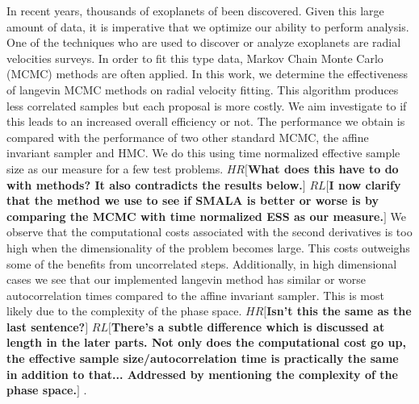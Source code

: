 \documentclass{aa}
\def\memohr#1{\color{blue}$HR[${\bf #1}$]$ \color{black}}
\def\memorl#1{\color{gray}$RL[${\bf #1}$]$ \color{black}}
\begin{document}
  \abstract
   {In recent years, thousands of exoplanets of been discovered. 
Given this large amount of data, it is imperative that we optimize our ability to perform analysis. 
One of the techniques who are used to discover or analyze exoplanets are radial velocities surveys. 
In order to fit this type data, Markov Chain Monte Carlo (MCMC) methods are often applied.}
   {In this work, we determine the effectiveness of langevin MCMC methods on radial velocity fitting. 
This algorithm produces less correlated samples but each proposal is more costly. 
We aim investigate to if this leads to an increased overall efficiency or not.}
   {The performance we obtain is compared with the performance of two other standard MCMC, the affine invariant sampler and HMC.
We do this using time normalized effective sample size as our measure for a few test problems. 
\memohr{What does this have to do with methods? It also contradicts the results below.}
\memorl{I now clarify that the method we use to see if SMALA is better or worse is by comparing the MCMC with time normalized ESS as our measure.}
}
   {We observe that the computational costs associated with the second derivatives is too high when the dimensionality of the problem becomes large.
This costs outweighs some of the benefits from uncorrelated steps. Additionally, in high dimensional cases we see that our implemented langevin method has similar or worse autocorrelation times compared to the affine invariant sampler. This is most likely due to the complexity of the phase space.
\memohr{Isn't this the same as the last sentence?}
\memorl{There's a subtle difference which is discussed at length in the later parts. Not only does the computational cost go up, the effective sample size/autocorrelation time is practically the same in addition to that... Addressed by mentioning the complexity of the phase space.}.
}
   {}


   \maketitle
%
\end{document}
